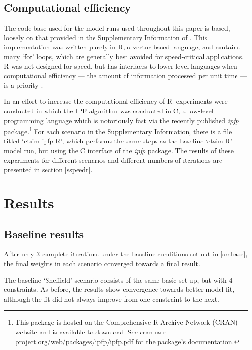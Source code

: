 \documentclass[a4paper,10pt]{article}
\begin{document}
\subsection{Computational efficiency}
The code-base used for the model runs used throughout this paper is based,
loosely on that provided in the Supplementary Information of
\citet{Lovelace2013-trs}. This implementation was written purely in R,
a vector based language, and contains many `for' loops, which are generally best
avoided for speed-critical applications. R was not designed for speed, but has
interfaces to lower level languages when computational efficiency --- the amount
of information processed per unit time --- is a priority \citep{wickham2014adv,Matloff-R}.

In an effort to increase the computational efficiency of R, experiments were
conducted in which the IPF algorithm was conducted in C, a low-level programming
language which is notoriously fast via the recently published
\emph{ipfp} package.\footnote{This package is
hosted on the Comprehensive R Archive Network (CRAN) website
and is available to download. See
\href{http://cran.us.r-project.org/web/packages/ipfp/ipfp.pdf}{cran.us.r-project.org/web/packages/ipfp/ipfp.pdf}
for the package's documentation.}
For each scenario in the Supplementary Information, there is a file titled `etsim-ipfp.R',
which performs the same steps as the baseline `etsim.R' model run, but using the C interface
of the \emph{ipfp} package.
The results of these experiments for
different scenarios and different numbers of iterations are presented in section
\cref{sspeedr}.

\section{Results}
\label{cresults}

\subsection{Baseline results}

After only 3 complete iterations under the baseline conditions
set out in \cref{smbase}, the final weights in each scenario
converged towards a final result.

The baseline `Sheffield' scenario consists of the same basic set-up, 
but with 4 constraints. As before, the results show convergence 
towards better model fit, although the fit did not always improve 
from one constraint to the next.
\end{document}
